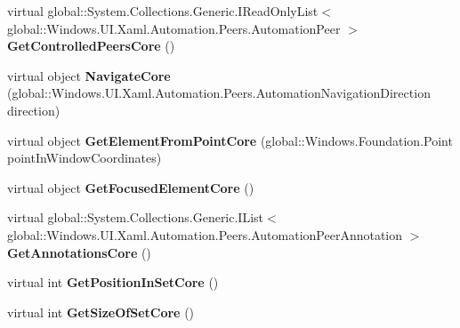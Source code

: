 \begin{DoxyCompactItemize}
virtual global\+::\+System.\+Collections.\+Generic.\+I\+Read\+Only\+List$<$ global\+::\+Windows.\+U\+I.\+Xaml.\+Automation.\+Peers.\+Automation\+Peer $>$ {\bfseries Get\+Controlled\+Peers\+Core} ()
\item 
\mbox{\label{class_windows_1_1_u_i_1_1_xaml_1_1_automation_1_1_peers_1_1_automation_peer_afd50c2697f066ad333995dc06a907be4}} 
virtual object {\bfseries Navigate\+Core} (global\+::\+Windows.\+U\+I.\+Xaml.\+Automation.\+Peers.\+Automation\+Navigation\+Direction direction)
\item 
\mbox{\label{class_windows_1_1_u_i_1_1_xaml_1_1_automation_1_1_peers_1_1_automation_peer_ae8260393672adea30e509cee8106d5ef}} 
virtual object {\bfseries Get\+Element\+From\+Point\+Core} (global\+::\+Windows.\+Foundation.\+Point point\+In\+Window\+Coordinates)
\item 
\mbox{\label{class_windows_1_1_u_i_1_1_xaml_1_1_automation_1_1_peers_1_1_automation_peer_afadb1e1f2c9abb79fa5e7189b24f159c}} 
virtual object {\bfseries Get\+Focused\+Element\+Core} ()
\item 
\mbox{\label{class_windows_1_1_u_i_1_1_xaml_1_1_automation_1_1_peers_1_1_automation_peer_ab6f0d05047a23ceac4c1969ba5a531c6}} 
virtual global\+::\+System.\+Collections.\+Generic.\+I\+List$<$ global\+::\+Windows.\+U\+I.\+Xaml.\+Automation.\+Peers.\+Automation\+Peer\+Annotation $>$ {\bfseries Get\+Annotations\+Core} ()
\item 
\mbox{\label{class_windows_1_1_u_i_1_1_xaml_1_1_automation_1_1_peers_1_1_automation_peer_a1bcb3ef7e7391852a768d6874d898f73}} 
virtual int {\bfseries Get\+Position\+In\+Set\+Core} ()
\item 
\mbox{\label{class_windows_1_1_u_i_1_1_xaml_1_1_automation_1_1_peers_1_1_automation_peer_a4f2274f1bbafc48d35ae4a1baaf68144}} 
virtual int {\bfseries Get\+Size\+Of\+Set\+Core} ()

\end{DoxyCompactItemize}

